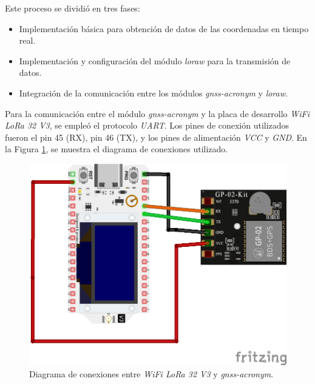 Este proceso se dividió en tres fases:

\begin{itemize}
    \item Implementación básica para obtención de datos de las coordenadas en tiempo real.
    \item Implementación y configuración del módulo \textit{\acrshort{loraw}} para la transmisión de datos.
    \item Integración de la comunicación entre los módulos \textit{\acrshort{gnss-acronym}} y \textit{\acrshort{loraw}}.
\end{itemize}

Para la comunicación entre el módulo \textit{\acrshort{gnss-acronym}} y la placa de desarrollo \textit{WiFi LoRa 32 V3}, se empleó el protocolo \textit{UART}. Los pines de conexión utilizados fueron el pin 45 (RX), pin 46 (TX), y los pines de alimentación \textit{VCC} y \textit{GND}. En la Figura \ref{fig:conexionGNSS}, se muestra el diagrama de conexiones utilizado.

\begin{figure}[H]
    \leavevmode
    \begin{minipage}{\textwidth}
    \begin{center}
    \includegraphics[scale=0.8]{./capitulo_04/imagen/diagramaGNSS.png}
    \caption{Diagrama de conexiones entre \textit{WiFi LoRa 32 V3} y \textit{\acrshort{gnss-acronym}}. \label{fig:conexionGNSS}}
    \end{center}
    \end{minipage}
\end{figure}

